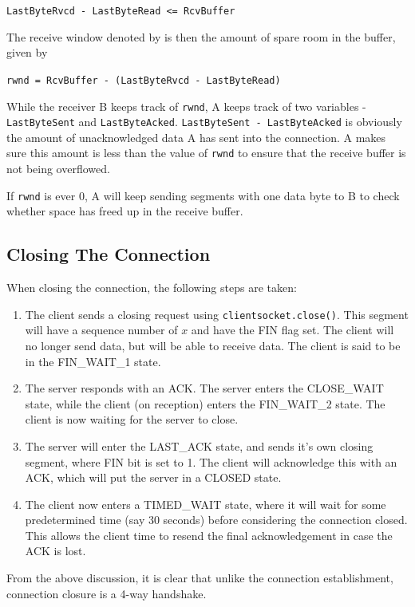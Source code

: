 \documentclass[12pt,letterpaper]{amsbook}
\theoremstyle{definition}
\begin{document}
\texttt{LastByteRvcd - LastByteRead <= RcvBuffer}

The receive window denoted by  is then the amount of spare room in the buffer, given by

\texttt{rwnd = RcvBuffer - (LastByteRvcd - LastByteRead)}

While the receiver B keeps track of \texttt{rwnd}, A keeps track of two variables - \texttt{LastByteSent} and \texttt{LastByteAcked}. \texttt{LastByteSent - LastByteAcked} is obviously the amount of unacknowledged data A has sent into the connection. A makes sure this amount is less than the value of \texttt{rwnd} to ensure that the receive buffer is not being overflowed.

If \texttt{rwnd} is ever 0, A will keep sending segments with one data byte to B to check whether space has freed up in the receive buffer.

\subsection{Closing The Connection}
When closing the connection, the following steps are taken:

\begin{enumerate}
  \item The client sends a closing request using \texttt{clientsocket.close()}. This segment will have a sequence number of $x$ and have the FIN flag set. The client will no longer send data, but will be able to receive data. The client is said to be in the FIN\_WAIT\_1 state.
  \item The server responds with an ACK. The server enters the CLOSE\_WAIT state, while the client (on reception) enters the FIN\_WAIT\_2 state. The client is now waiting for the server to close.
  \item The server will enter the LAST\_ACK state, and sends it's own closing segment, where FIN bit is set to 1. The client will acknowledge this with an ACK, which will put the server in a CLOSED state.
  \item The client now enters a TIMED\_WAIT state, where it will wait for some predetermined time (say 30 seconds) before considering the connection closed. This allows the client time to resend the final acknowledgement in case the ACK is lost.
\end{enumerate}

From the above discussion, it is clear that unlike the connection establishment, connection closure is a 4-way handshake.
\end{document}
